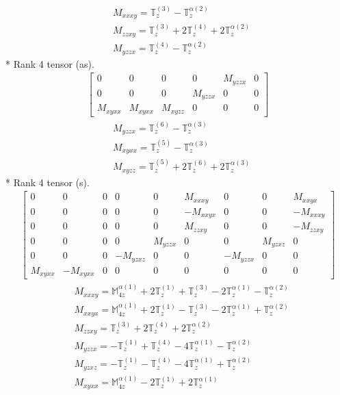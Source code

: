 \documentclass[fleqn,8pt,landscape]{jsarticle}
\begin{document}
\begin{align*}
& M_{xxxy} = \mathbb{T}_{z}^{(3)} - \mathbb{T}_{z}^{\alpha(2)} \\
& M_{zzxy} = \mathbb{T}_{z}^{(3)} + 2 \mathbb{T}_{z}^{(4)} + 2 \mathbb{T}_{z}^{\alpha(2)} \\
& M_{yzzx} = \mathbb{T}_{z}^{(4)} - \mathbb{T}_{z}^{\alpha(2)}
\end{align*}
* Rank 4 tensor (as).
\begin{align*}
\begin{bmatrix} 0 & 0 & 0 & 0 & M_{yzzx} & 0 \\ 0 & 0 & 0 & M_{yzzx} & 0 & 0 \\ M_{xyxx} & M_{xyxx} & M_{xyzz} & 0 & 0 & 0 \end{bmatrix}
\end{align*}
\begin{align*}
& M_{yzzx} = \mathbb{T}_{z}^{(6)} - \mathbb{T}_{z}^{\alpha(3)} \\
& M_{xyxx} = \mathbb{T}_{z}^{(5)} - \mathbb{T}_{z}^{\alpha(3)} \\
& M_{xyzz} = \mathbb{T}_{z}^{(5)} + 2 \mathbb{T}_{z}^{(6)} + 2 \mathbb{T}_{z}^{\alpha(3)}
\end{align*}
* Rank 4 tensor (s).
\begin{align*}
\begin{bmatrix} 0 & 0 & 0 & 0 & 0 & M_{xxxy} & 0 & 0 & M_{xxyx} \\ 0 & 0 & 0 & 0 & 0 & - M_{xxyx} & 0 & 0 & - M_{xxxy} \\ 0 & 0 & 0 & 0 & 0 & M_{zzxy} & 0 & 0 & - M_{zzxy} \\ 0 & 0 & 0 & 0 & M_{yzzx} & 0 & 0 & M_{yzxz} & 0 \\ 0 & 0 & 0 & - M_{yzxz} & 0 & 0 & - M_{yzzx} & 0 & 0 \\ M_{xyxx} & - M_{xyxx} & 0 & 0 & 0 & 0 & 0 & 0 & 0 \end{bmatrix}
\end{align*}
\begin{align*}
& M_{xxxy} = \mathbb{M}_{4z}^{\alpha(1)} + 2 \mathbb{T}_{z}^{(1)} + \mathbb{T}_{z}^{(3)} - 2 \mathbb{T}_{z}^{\alpha(1)} - \mathbb{T}_{z}^{\alpha(2)} \\
& M_{xxyx} = \mathbb{M}_{4z}^{\alpha(1)} + 2 \mathbb{T}_{z}^{(1)} - \mathbb{T}_{z}^{(3)} - 2 \mathbb{T}_{z}^{\alpha(1)} + \mathbb{T}_{z}^{\alpha(2)} \\
& M_{zzxy} = \mathbb{T}_{z}^{(3)} + 2 \mathbb{T}_{z}^{(4)} + 2 \mathbb{T}_{z}^{\alpha(2)} \\
& M_{yzzx} = - \mathbb{T}_{z}^{(1)} + \mathbb{T}_{z}^{(4)} - 4 \mathbb{T}_{z}^{\alpha(1)} - \mathbb{T}_{z}^{\alpha(2)} \\
& M_{yzxz} = - \mathbb{T}_{z}^{(1)} - \mathbb{T}_{z}^{(4)} - 4 \mathbb{T}_{z}^{\alpha(1)} + \mathbb{T}_{z}^{\alpha(2)} \\
& M_{xyxx} = \mathbb{M}_{4z}^{\alpha(1)} - 2 \mathbb{T}_{z}^{(1)} + 2 \mathbb{T}_{z}^{\alpha(1)}
\end{align*}
\end{document}
